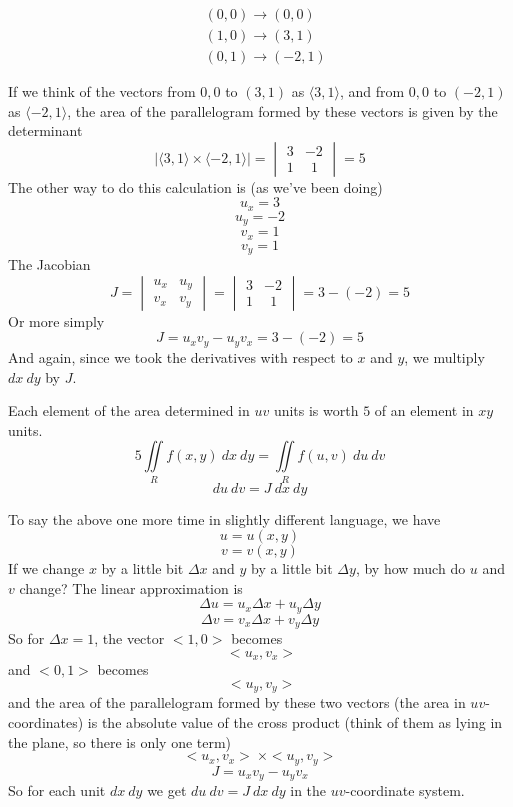 \documentclass[11pt, oneside]{article}
\begin{document}
\begin{align*}
& (0,0) \to (0,0) \\
& (1,0) \to (3,1) \\
& (0,1) \to (-2,1)
\end{align*}

If we think of the vectors from $0,0$ to $(3,1)$ as $\langle 3, 1 \rangle$,  and from $0,0$ to $(-2,1)$ as $\langle -2 ,1 \rangle$, the area of the parallelogram formed by these vectors is given by the determinant
\[
| \langle 3, 1 \rangle \times \langle -2 ,1 \rangle | =
\begin{vmatrix}
3 & -2 \\
1 & \ \ 1 
\end{vmatrix} = 5
\]
The other way to do this calculation is (as we've been doing)
\[ u_x = 3 \]
\[ u_y = -2 \]
\[ v_x = 1 \]
\[ v_y = 1 \]
The Jacobian
\[ J = 
\begin{vmatrix}
u_x & u_y \\
v_x & v_y 
\end{vmatrix} = 
\begin{vmatrix}
3 & -2 \\
1 & \ \ 1 
\end{vmatrix}
= 3 - (-2) = 5 \]
Or more simply
\[ J = u_x v_y - u_y v_x = 3  - (-2) = 5 \]
And again, since we took the derivatives with respect to $x$ and $y$, we multiply $dx \ dy$ by $J$.

Each element of the area determined in $uv$ units is worth $5$ of an element in $xy$ units.
\[ 5 \iint\limits_{R}  f(x,y) \ dx \ dy = \iint\limits_{R}  f(u,v) \ du \ dv \]
\begin{equation}
\boxed{du \ dv = J \ dx \ dy }
\end{equation}

To say the above one more time in slightly different language, we have
\[ u = u(x,y) \]
\[ v = v(x,y) \]
If we change $x$ by a little bit $\Delta x$ and $y$ by a little bit $\Delta y$, by how much do $u$ and $v$ change? 
The linear approximation is
\[ \Delta u = u_x \Delta x + u_y \Delta y \]
\[ \Delta v = v_x \Delta x + v_y \Delta y \]
So for $\Delta x = 1$, the vector $<1,0>$ becomes
\[ \ <u_x ,v_x> \]
and $<0,1>$ becomes
\[ \ <u_y ,v_y> \]
and the area of the parallelogram formed by these two vectors (the area in $uv$-coordinates) is the absolute value of the cross product (think of them as lying in the plane, so there is only one term)
\[ <u_x ,v_x> \ \times  <u_y ,v_y > \]
\[ J = u_x v_y - u_y v_x \]
So for each unit $dx \ dy$ we get $du \ dv = J \ dx \ dy $ in the $uv$-coordinate system.
\end{document}
